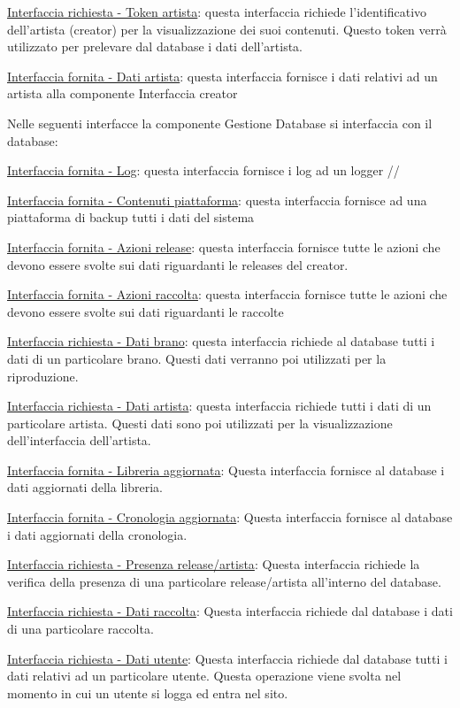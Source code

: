 \documentclass[a4paper,12pt]{article}
\begin{document}
\underline{Interfaccia richiesta - Token artista}: questa interfaccia richiede l’identificativo dell’artista (creator) per la visualizzazione dei suoi contenuti. Questo token verrà utilizzato per prelevare dal database i dati dell’artista.

\underline{Interfaccia fornita - Dati artista}: questa interfaccia fornisce i dati relativi ad un artista alla componente Interfaccia creator

Nelle seguenti interfacce la componente Gestione Database si interfaccia con il database:

\underline{Interfaccia fornita - Log}: questa interfaccia fornisce i log ad un logger //

\underline{Interfaccia fornita - Contenuti piattaforma}: questa interfaccia fornisce ad una piattaforma di backup tutti i dati del sistema 

\underline{Interfaccia fornita - Azioni release}: questa interfaccia fornisce tutte le azioni che devono essere svolte sui dati riguardanti le releases del creator.

\underline{Interfaccia fornita - Azioni raccolta}: questa interfaccia fornisce tutte le azioni che devono essere svolte sui dati riguardanti le raccolte 

\underline{Interfaccia richiesta - Dati brano}: questa interfaccia richiede al database tutti i dati di un particolare brano. Questi dati verranno poi utilizzati per la riproduzione.

\underline{Interfaccia richiesta - Dati artista}: questa interfaccia richiede tutti i dati di un particolare artista. Questi dati sono poi utilizzati per la visualizzazione dell’interfaccia dell’artista.

\underline{Interfaccia fornita - Libreria aggiornata}: Questa interfaccia fornisce al database i dati aggiornati della libreria.

\underline{Interfaccia fornita - Cronologia aggiornata}: Questa interfaccia fornisce al database i dati aggiornati della cronologia.

\underline{Interfaccia richiesta - Presenza release/artista}: Questa interfaccia richiede la verifica della presenza di una particolare release/artista all’interno del database.

\underline{Interfaccia richiesta - Dati raccolta}: Questa interfaccia richiede dal database i dati di una particolare raccolta.

\underline{Interfaccia richiesta - Dati utente}: Questa interfaccia richiede dal database tutti i dati relativi ad un particolare utente. Questa operazione viene svolta nel momento in cui un utente si logga ed entra nel sito.
\end{document}
